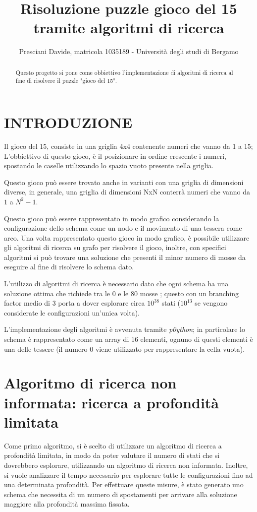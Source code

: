 \documentclass[letterpaper, 10 pt]{IEEEconf}
\title{\LARGE \bf
Risoluzione puzzle gioco del 15 tramite algoritmi di ricerca
}
\author{Presciani Davide, matricola 1035189 - Università degli studi di Bergamo}
\begin{document}
\maketitle

\begin{abstract}

Questo progetto si pone come obbiettivo l’implementazione di algoritmi di ricerca al fine di risolvere il puzzle "gioco del 15".

\end{abstract}


\section{INTRODUZIONE}
Il gioco del 15, consiste in una griglia 4x4 contenente numeri che vanno da 1 a 15; L'obbiettivo di questo gioco, è il posizionare in ordine crescente i numeri, spostando le caselle utilizzando lo spazio vuoto presente nella griglia.\par
Questo gioco può essere trovato anche in varianti con una griglia di dimensioni diverse, in generale, una griglia di dimensioni NxN conterrà numeri che vanno da $1$ a $N^2-1$.\par
Questo gioco può essere rappresentato in modo grafico considerando la configurazione dello schema come un nodo e il movimento di una tessera come arco.
Una volta rappresentato questo gioco in modo grafico, è possibile utilizzare gli algoritmi di ricerca su grafo per risolvere il gioco, inoltre, con specifici algoritmi si può trovare una soluzione che presenti il minor numero di mosse da eseguire al fine di risolvere lo schema dato.\par
L'utilizzo di algoritmi di ricerca è necessario dato che ogni schema ha una soluzione ottima che richiede tra le 0 e le 80 mosse \cite{brungger1999parallel}; questo con un branching factor medio di 3 porta a dover esplorare circa $10^{38}$ stati ($10^{13}$ se vengono considerate le configurazioni un'unica volta).\par
L'implementazione degli algoritmi è avvenuta tramite \textit{p0ython}; in particolare lo schema è rappresentato come un array di 16 elementi, ognuno di questi elementi è una delle tessere (il numero 0 viene utilizzato per rappresentare la cella vuota).


\section{Algoritmo di ricerca non informata: ricerca a profondità limitata}
Come primo algoritmo, si è scelto di utilizzare un algoritmo di ricerca a profondità limitata, in modo da poter valutare il numero di stati che si dovrebbero esplorare, utilizzando un algoritmo di ricerca non informata. Inoltre, si vuole analizzare il tempo necessario per esplorare tutte le configurazioni fino ad una determinata profondità. Per effettuare queste misure, è stato generato uno schema che necessita di un numero di spostamenti per arrivare alla soluzione maggiore alla profondità massima fissata.\par
\end{document}

